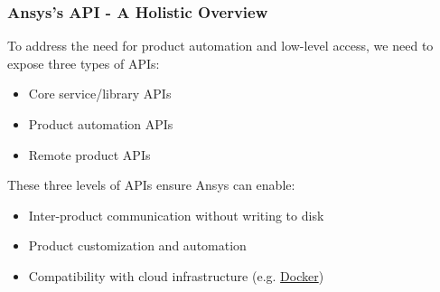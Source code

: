 \documentclass[t]{beamer}
\begin{document}
\begin{frame}
  \frametitle{Ansys's API - A Holistic Overview}

  To address the need for product automation and low-level access, we need to
  expose three types of APIs:

    \begin{itemize}
      \item Core service/library APIs
      \item Product automation APIs
      \item Remote product APIs
    \end{itemize}

    These three levels of APIs ensure Ansys can enable:

    \begin{itemize}
      \item Inter-product communication without writing to disk
      \item Product customization and automation
      \item Compatibility with cloud infrastructure (e.g. \href{https://www.docker.com/}{Docker})
    \end{itemize}

\end{frame}


\end{document}
